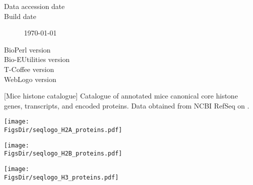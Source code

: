   \begin{description}
    \item[Data accession date] \hfill \newline
      \printdate{\SequencesDate}
    \item[Build date] \hfill \newline
      \today
    \item[BioPerl version] \hfill \newline
      \BioPerlVersion{}
    \item[Bio-EUtilities version] \hfill \newline
      \BioEUtilitiesVersion
    \item[T-Coffee version] \hfill \newline
      \TCoffeVersion
    \item[WebLogo version] \hfill \newline
      \WebLogoVersion
  \end{description}

  \newpage
  \begin{center}
  
  \end{center}

  \newpage
  \begin{center}
  [Mice histone catalogue]{%
    Catalogue of annotated mice canonical core histone genes, transcripts,
    and encoded proteins.
    Data obtained from NCBI RefSeq \citep{OLearyRefseq2016} on \SequencesDate{}.
  }
  \label{tab:mice:histone-catalogue}
  
  \end{center}

  \newpage
  \begin{center}
  
  \texttt{[image: \\FigsDir/seqlogo\_H2A\_proteins.pdf]}
  \end{center}

  \newpage
  \begin{center}
  
  \texttt{[image: \\FigsDir/seqlogo\_H2B\_proteins.pdf]}
  \end{center}

  \newpage
  \begin{center}
  
  \texttt{[image: \\FigsDir/seqlogo\_H3\_proteins.pdf]}
  \end{center}

